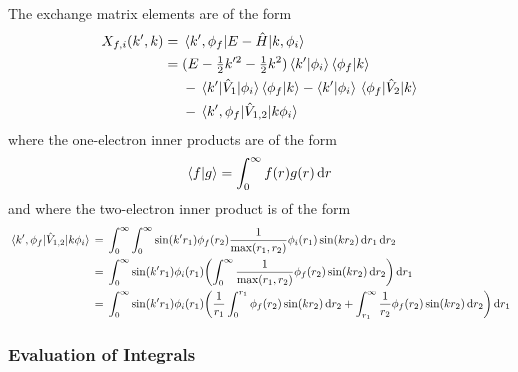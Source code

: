 \documentclass{article}
\begin{document}
The exchange matrix elements are of the form
\begin{alignat*}{2}
  X_{f, i}\lr{k', k}
  {}={}
  &
  \mel{k', \phi_{f}}{E - \hat{H}}{k, \phi_{i}}
  \\
  {}={}
  &
  \lr
  {
    E
    -
    \tfrac{1}{2} k'^{2}
    -
    \tfrac{1}{2} k^{2}
  }
  \braket{k'}{\phi_{i}}
  \braket{\phi_{f}}{k}
  \\
  &
  {}-{}
  \mel{k'}{\hat{V}_{1}}{\phi_{i}}
  \braket{\phi_{f}}{k}
  -
  \braket{k'}{\phi_{i}}
  \mel{\phi_{f}}{\hat{V}_{2}}{k}
  \\
  &
  {}-{}
  \mel{k', \phi_{f}}{\hat{V}_{1, 2}}{k \phi_{i}}
\end{alignat*}
where the one-electron inner products are of the form
\begin{equation*}
  \braket{f}{g}
  =
  \int_{0}^{\infty}
  {
    f\lr{r}
    g\lr{r}
  }
  \dd{r}
\end{equation*}
and where the two-electron inner product is of the form
\begin{alignat*}{2}
  \mel{k', \phi_{f}}{\hat{V}_{1, 2}}{k \phi_{i}}
  {}={}
  &
  \int_{0}^{\infty}
  \int_{0}^{\infty}
  {
    \sin\lr{k' r_{1}}
    \phi_{f}\lr{r_{2}}
    \dfrac{1}{\max\lr{r_{1}, r_{2}}}
    \phi_{i}\lr{r_{1}}
    \sin\lr{k r_{2}}
  }
  \dd{r_{1}}
  \dd{r_{2}}
  \\
  {}={}
  &
  \int_{0}^{\infty}
  {
    \sin\lr{k' r_{1}}
    \phi_{i}\lr{r_{1}}
    \lr[\bigg]
    {
      \int_{0}^{\infty}
      {
        \dfrac{1}{\max\lr{r_{1}, r_{2}}}
        \phi_{f}\lr{r_{2}}
        \sin\lr{k r_{2}}
      }
      \dd{r_{2}}
    }
  }
  \dd{r_{1}}
  \\
  {}={}
  &
  \int_{0}^{\infty}
  {
    \sin\lr{k' r_{1}}
    \phi_{i}\lr{r_{1}}
    \lr[\bigg]
    {
      \dfrac{1}{r_{1}}
      \int_{0}^{r_{1}}
      {
        \phi_{f}\lr{r_{2}}
        \sin\lr{k r_{2}}
      }
      \dd{r_{2}}
      +
      \int_{r_{1}}^{\infty}
      {
        \dfrac{1}{r_{2}}
        \phi_{f}\lr{r_{2}}
        \sin\lr{k r_{2}}
      }
      \dd{r_{2}}
    }
  }
  \dd{r_{1}}
  \\
\end{alignat*}

\subsubsection{Evaluation of Integrals}
\label{sec:eval-int}
\end{document}
